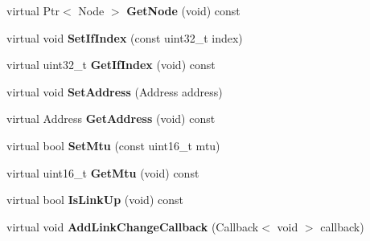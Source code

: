 \begin{DoxyCompactItemize}
\mbox{\label{classns3_1_1lorawan_1_1LoraNetDevice_a0810326c5ad182df272d4e4596f12ee2}} 
virtual Ptr$<$ Node $>$ {\bfseries Get\+Node} (void) const
\item 
\mbox{\label{classns3_1_1lorawan_1_1LoraNetDevice_ac7cf071cf291cb72644edd696736ed9e}} 
virtual void {\bfseries Set\+If\+Index} (const uint32\+\_\+t index)
\item 
\mbox{\label{classns3_1_1lorawan_1_1LoraNetDevice_ac1cfb5c5c9707c0b58500646c50ff7c9}} 
virtual uint32\+\_\+t {\bfseries Get\+If\+Index} (void) const
\item 
\mbox{\label{classns3_1_1lorawan_1_1LoraNetDevice_afc689764dfeed1fb61d2e713fcd2e6ef}} 
virtual void {\bfseries Set\+Address} (Address address)
\item 
\mbox{\label{classns3_1_1lorawan_1_1LoraNetDevice_a25647664694525186d130e6b18764d6a}} 
virtual Address {\bfseries Get\+Address} (void) const
\item 
\mbox{\label{classns3_1_1lorawan_1_1LoraNetDevice_a33547f2948f62a765350cb3afd5652ad}} 
virtual bool {\bfseries Set\+Mtu} (const uint16\+\_\+t mtu)
\item 
\mbox{\label{classns3_1_1lorawan_1_1LoraNetDevice_a6f940fc840e345dc47adb8c240b1eef1}} 
virtual uint16\+\_\+t {\bfseries Get\+Mtu} (void) const
\item 
\mbox{\label{classns3_1_1lorawan_1_1LoraNetDevice_abd4f25cf91580a899f3446293dbe96d0}} 
virtual bool {\bfseries Is\+Link\+Up} (void) const
\item 
\mbox{\label{classns3_1_1lorawan_1_1LoraNetDevice_a7004260f1d2817cda0cea20f0abec3ae}} 
virtual void {\bfseries Add\+Link\+Change\+Callback} (Callback$<$ void $>$ callback)
\item 
\mbox{\label{classns3_1_1lorawan_1_1LoraNetDevice_a04011b7a1bcfae80bcfc55c65ad3a835}} 

\end{DoxyCompactItemize}
